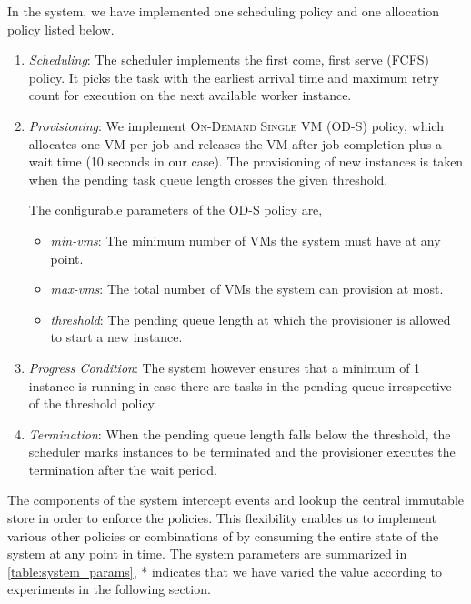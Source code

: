 \documentclass[a4paper]{IEEEtran}
\begin{document}
In the system, we have implemented one scheduling policy and one allocation policy listed below.

\begin{enumerate}
  \item \emph{Scheduling}: The scheduler implements the first come, first serve (FCFS) policy.
  It picks the task with the earliest arrival time and maximum retry count for execution on the next available
  worker instance.

  \item \emph{Provisioning}: We implement \textsc{On-Demand Single VM (OD-S)} policy, which allocates 
  one VM per job and releases the VM after job completion plus a wait time (10 seconds in our case). The provisioning
  of new instances is taken when the pending task queue length crosses the given threshold.

  The configurable parameters of the OD-S policy are,
    \begin{itemize}
      \item \emph{min-vms}: The minimum number of VMs the system must have at any point.
      \item \emph{max-vms}: The total number of VMs the system can provision at most.
      \item \emph{threshold}: The pending queue length at which the provisioner is allowed to start a new instance. 
    \end{itemize} 

  \item \emph{Progress Condition}: The system however ensures that a minimum of 1 instance is running in case there are 
  tasks in the pending queue irrespective of the threshold policy. 

  \item \emph{Termination}: When the pending queue length falls below the threshold, the scheduler marks instances to be
  terminated and the provisioner executes the termination after the wait period.
\end{enumerate}

The components of the system intercept events and lookup the central immutable store in order to enforce the policies. 
This flexibility enables us to implement various other policies or combinations of by consuming the entire state of the 
system at any point in time. The system parameters are summarized in \autoref{table:system_params}, * indicates
that we have varied the value according to experiments in the following section.
\end{document}
